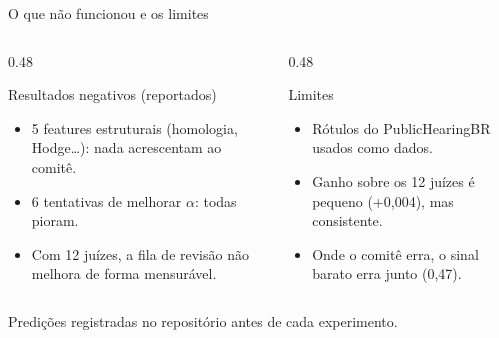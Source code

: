 \documentclass[aspectratio=169,11pt]{beamer}
\begin{document}
\begin{frame}{O que não funcionou e os limites}
  \begin{columns}[T]
    \begin{column}{0.48\textwidth}
      \begin{block}{Resultados negativos (reportados)}\small
        \begin{itemize}\setlength{\itemsep}{3pt}
          \item 5 features estruturais (homologia, Hodge\ldots): nada acrescentam ao comitê.
          \item 6 tentativas de melhorar $\alpha$: todas pioram.
          \item Com 12 juízes, a fila de revisão não melhora de forma mensurável.
        \end{itemize}
      \end{block}
    \end{column}
    \begin{column}{0.48\textwidth}
      \begin{alertblock}{Limites}\small
        \begin{itemize}\setlength{\itemsep}{3pt}
          \item Rótulos do PublicHearingBR usados como dados.
          \item Ganho sobre os 12 juízes é pequeno (+0,004), mas consistente.
          \item Onde o comitê erra, o sinal barato erra junto (0,47).
        \end{itemize}
      \end{alertblock}
    \end{column}
  \end{columns}
  \vspace{0.3cm}
  \centering\small Predições registradas no repositório antes de cada experimento.
\end{frame}
\end{document}
